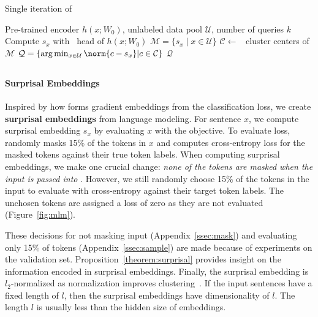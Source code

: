 \begin{algorithm}[!t]
\caption{Single iteration of \alps}
\label{alg:alps}
\begin{algorithmic}[1]
    \Require Pre-trained encoder $h(x; W_0)$, unlabeled data pool
    $\mathcal{U}$, number of queries $k$
        \State Compute $s_x$ with \mlm~head of $h(x; W_0)$
    \EndFor
    \State $\mathcal{M} = \{s_x \mid x \in \mathcal{U}\}$
    \State $\mathcal{C} \gets$ \km~cluster centers of $\mathcal{M}$
    \State $\mathcal{Q} = \{\arg\min_{x \in \mathcal{U}} \norm{c-s_x}  | c \in \mathcal{C}  \}$
    \State \Return $\mathcal{Q}$
\end{algorithmic}
\end{algorithm}

\subsection{\alps}


\paragraph{Surprisal Embeddings}
Inspired by how \badge{} forms gradient embeddings from the
classification loss, we create \textbf{surprisal embeddings} from language
modeling.  For sentence $x$, we compute surprisal embedding $s_x$ by evaluating
$x$ with the \mlm{} objective.
To evaluate \mlm{} loss, \bert{} randomly masks 15\% of the tokens in $x$ and
computes cross-entropy loss for the
masked tokens against their true token labels.
When computing surprisal embeddings, we
make one crucial change: \textit{none of the tokens are masked when the input is
passed into \bert}.  However, we still randomly choose 15\% of the tokens in the
input to evaluate with cross-entropy against their target token labels.  The
unchosen tokens are assigned a loss of zero as they are not evaluated (Figure~\ref{fig:mlm}).

These decisions for not masking input (Appendix~\ref{ssec:mask}) and
evaluating only 15\% of tokens (Appendix~\ref{ssec:sample}) are made because of
experiments on the validation set.
Proposition~\ref{theorem:surprisal} provides insight on the information
encoded in surprisal
embeddings.
Finally, the surprisal embedding is $l_2$-normalized as
normalization improves
clustering~\citep{aytekin-2018}.
If the input sentences have a fixed length of $l$, then the surprisal embeddings
have dimensionality of $l$.  The length $l$ is usually less than the hidden
size of \bert{} embeddings.


